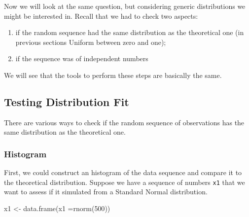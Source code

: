 \documentclass[
]{book}
\newenvironment{Shaded}{\begin{snugshade}}{\end{snugshade}}
\newcommand{\AttributeTok}[1]{\textcolor[rgb]{0.77,0.63,0.00}{#1}}
\newcommand{\DecValTok}[1]{\textcolor[rgb]{0.00,0.00,0.81}{#1}}
\newcommand{\FunctionTok}[1]{\textcolor[rgb]{0.00,0.00,0.00}{#1}}
\newcommand{\NormalTok}[1]{#1}
\newcommand{\OtherTok}[1]{\textcolor[rgb]{0.56,0.35,0.01}{#1}}
\theoremstyle{definition}
\theoremstyle{definition}
\theoremstyle{definition}
\theoremstyle{definition}
\theoremstyle{remark}
\begin{document}
Now we will look at the same question, but considering generic distributions we might be interested in. Recall that we had to check two aspects:

\begin{enumerate}
\def\labelenumi{\arabic{enumi}.}
\item
  if the random sequence had the same distribution as the theoretical one (in previous sections Uniform between zero and one);
\item
  if the sequence was of independent numbers
\end{enumerate}

We will see that the tools to perform these steps are basically the same.

\hypertarget{testing-distribution-fit}{%
\subsection{Testing Distribution Fit}\label{testing-distribution-fit}}

There are various ways to check if the random sequence of observations has the same distribution as the theoretical one.

\hypertarget{histogram}{%
\subsubsection{Histogram}\label{histogram}}

First, we could construct an histogram of the data sequence and compare it to the theoretical distribution. Suppose we have a sequence of numbers \texttt{x1} that we want to assess if it simulated from a Standard Normal distribution.

\begin{Shaded}
\begin{Highlighting}[]
\NormalTok{x1 }\OtherTok{\textless{}{-}} \FunctionTok{data.frame}\NormalTok{(}\AttributeTok{x1 =}\FunctionTok{rnorm}\NormalTok{(}\DecValTok{500}\NormalTok{))}
\end{Highlighting}
\end{Shaded}
\end{document}
